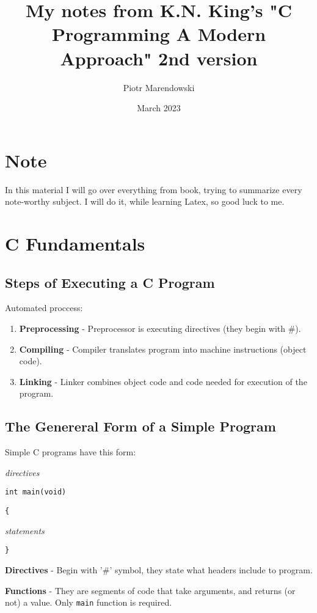\documentclass[12pt, openany]{book}
\title{My notes from K.N. King's "C Programming A Modern Approach" 2nd version}
\author{Piotr Marendowski}
\date{March 2023}
\newcommand\tab[1][20px]{\hspace*{#1}}      %
\begin{document}
    \maketitle

    \chapter{Note}
    In this material I will go over everything from book,
    trying to summarize every note-worthy subject. I will do
    it, while learning Latex, so good luck to me.

    \tableofcontents

    \chapter{C Fundamentals}
    
    \section{Steps of Executing a C Program}
    Automated proccess:
    \begin{enumerate}
        \item\textbf{Preprocessing} - Preprocessor is executing directives
        (they begin with \#).
        \item\textbf{Compiling} - Compiler translates program into machine
        instructions (object code).
        \item\textbf{Linking} - Linker combines object code and code needed
        for execution of the program.
    \end{enumerate}

    \section{The Genereral Form of a Simple Program}
    Simple C programs have this form: \smallskip

    \smallskip
    \textit{directives} 
    \smallskip

    \texttt{int main(void)}

    \texttt{\{}

    \tab\textit{statements}

    \texttt{\}}
    \bigskip

    \textbf{Directives} - Begin with '\#' symbol, they state what headers
    include to program.

    \textbf{Functions} - They are segments of code that take arguments, and
    returns (or not) a value. Only \texttt{main} function is required.
\end{document}
